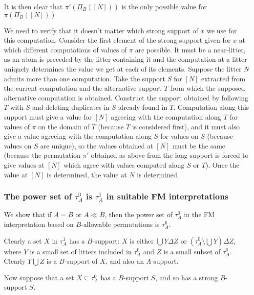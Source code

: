 \documentclass[12pt]{article}
\begin{document}
It is then clear that $\pi'(\Pi_B([N]))$ is the only possible value for  $\pi(\Pi_B([N]))$

We need to verify that it doesn't matter which strong support of $x$ we use for this computation.  Consider the first element of the strong support given for
$x$ at which different computations of values of $\pi$ are possible.  It must be a near-litter, as an atom is preceded by the litter containing it and the computation at a litter
uniquely determines the value we get at each of its elements.  Suppose the litter $N$ admits more than one computation.  Take the support $S$ for $[N]$ extracted
from the current computation and the alternative support $T$ from which the supposed alternative computation is obtained.  Construct the support obtained by
following $T$ with $S$ and deleting duplicates in $S$ already found in $T$.  Computation along this support must give a value for $[N]$ agreeing with the computation
along $T$ for values of $\pi$ on the domain of $T$ (because $T$ is considered first), and it must also give a value agreeing with the computation along $S$ for values on $S$ (because values on $S$ are unique), so the values obtained at $[N]$ must be the same (because the permutation $\pi'$ obtained as above from the long support is forced to give values at $[N]$ which agree with values computed along $S$ or $T$).  Once the value at $[N]$ is determined, the value at $N$ is determined.


\newpage

\subsubsection{The power set of $\tau^0_A$ is $\tau^1_A$ in suitable FM interpretations}

We show that if $A=B$ or $A \ll B$, then the power set of $\tau^0_A$ in the FM interpretation based on $B$-allowable permutations is $\tau^0_A$.

Clearly a set $X$ in $\tau^1_A$ has a $B$-support:  $X$ is either $\bigcup Y \Delta Z$ or $(\tau^0_A \setminus \bigcup Y) \Delta Z$, where $Y$ is a small set
of litters included in $\tau^0_A$ and $Z$ is a small subset of $\tau^0_A$.  Clearly $Y \bigcup Z$ is a $B$-support of $X$, and also an $A$-support.

Now suppose that a set $X \subseteq \tau^0_A$ has a $B$-support $S$, and so has a strong $B$-support $S$.
\end{document}
